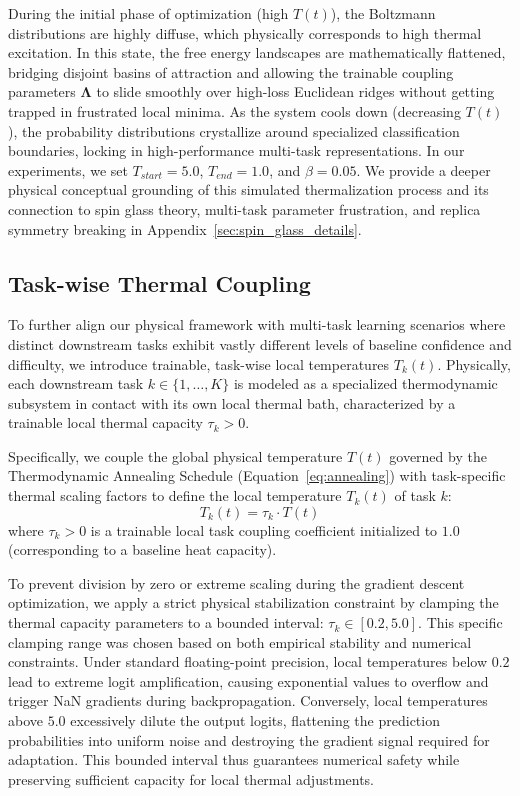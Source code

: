 During the initial phase of optimization (high $T(t)$), the Boltzmann distributions are highly diffuse, which physically corresponds to high thermal excitation. In this state, the free energy landscapes are mathematically flattened, bridging disjoint basins of attraction and allowing the trainable coupling parameters $\boldsymbol{\Lambda}$ to slide smoothly over high-loss Euclidean ridges without getting trapped in frustrated local minima. As the system cools down (decreasing $T(t)$), the probability distributions crystallize around specialized classification boundaries, locking in high-performance multi-task representations. In our experiments, we set $T_{start} = 5.0$, $T_{end} = 1.0$, and $\beta = 0.05$. We provide a deeper physical conceptual grounding of this simulated thermalization process and its connection to spin glass theory, multi-task parameter frustration, and replica symmetry breaking in Appendix~\ref{sec:spin_glass_details}.

\subsection{Task-wise Thermal Coupling}
\label{sec:task_coupling}
To further align our physical framework with multi-task learning scenarios where distinct downstream tasks exhibit vastly different levels of baseline confidence and difficulty, we introduce trainable, task-wise local temperatures $T_k(t)$. Physically, each downstream task $k \in \{1,\dots,K\}$ is modeled as a specialized thermodynamic subsystem in contact with its own local thermal bath, characterized by a trainable local thermal capacity $\tau_k > 0$.

Specifically, we couple the global physical temperature $T(t)$ governed by the Thermodynamic Annealing Schedule (Equation~\eqref{eq:annealing}) with task-specific thermal scaling factors to define the local temperature $T_k(t)$ of task $k$:
\begin{equation}
\label{eq:thermo_task}
T_k(t) = \tau_k \cdot T(t)
\end{equation}
where $\tau_k > 0$ is a trainable local task coupling coefficient initialized to $1.0$ (corresponding to a baseline heat capacity). 

To prevent division by zero or extreme scaling during the gradient descent optimization, we apply a strict physical stabilization constraint by clamping the thermal capacity parameters to a bounded interval: $\tau_k \in [0.2, 5.0]$. This specific clamping range was chosen based on both empirical stability and numerical constraints. Under standard floating-point precision, local temperatures below $0.2$ lead to extreme logit amplification, causing exponential values to overflow and trigger NaN gradients during backpropagation. Conversely, local temperatures above $5.0$ excessively dilute the output logits, flattening the prediction probabilities into uniform noise and destroying the gradient signal required for adaptation. This bounded interval thus guarantees numerical safety while preserving sufficient capacity for local thermal adjustments. 

